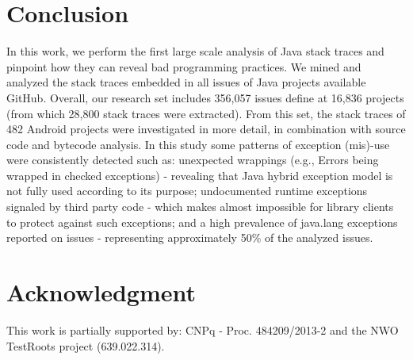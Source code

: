 \documentclass[conference]{IEEEtran}
\begin{document}
\section{Conclusion}

In this work, we perform the first large scale analysis of Java stack traces and pinpoint how they can reveal bad programming practices. We mined and analyzed the stack traces embedded in all issues of Java projects available GitHub. Overall, our research set includes 356,057 issues define at 16,836 projects (from which 28,800 stack traces were extracted). From this set, the stack traces of 482 Android projects were investigated in more detail, in combination with source code and bytecode analysis. In this study some patterns of exception (mis)-use were consistently detected such as: unexpected wrappings (e.g., Errors being wrapped in checked exceptions) - revealing that Java hybrid exception model is not fully used according to its purpose;  undocumented runtime exceptions signaled by third party code - which makes almost impossible for library clients to protect against such exceptions; and a high prevalence of java.lang exceptions reported on issues - representing approximately 50\% of the analyzed issues.





\section*{Acknowledgment}
This work is partially supported by: CNPq - Proc. 484209/2013-2 and the NWO TestRoots project (639.022.314).





\end{document}
